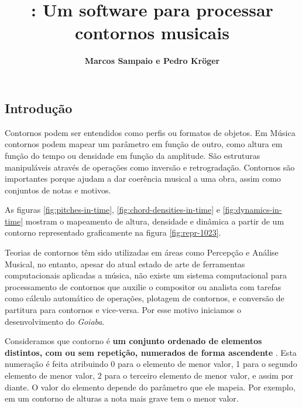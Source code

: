 \documentclass{sciposter}
\title{\goiaba{}: Um software para processar contornos musicais}
\author{\textbf{Marcos Sampaio e Pedro Kröger}}
\institute{Genos---Grupo de pesquisa em computação musical}
\newcommand{\goiaba}[1]{\textit{Goiaba}}
\begin{document}



\maketitle

\begin{multicols}{3}

\section{Introdução}

Contornos podem ser entendidos como perfis ou formatos de objetos. Em
Música contornos podem mapear um parâmetro em função de outro, como
altura em função do tempo ou densidade em função da amplitude. São
estruturas manipuláveis através de operações como inversão e
retrogradação. Contornos são importantes porque ajudam a dar coerência
musical a uma obra, assim como conjuntos de notas e motivos.

As figuras \ref{fig:pitches-in-time},
\ref{fig:chord-densities-in-time} e \ref{fig:dynamics-in-time} mostram
o mapeamento de altura, densidade e dinâmica a partir de um contorno
representado graficamente na figura \ref{fig:repr-1023}.

Teorias de contornos
\cite{friedmann85:methodology,morris87:composition,morris93:directions,marvin.ea87:relating,clifford95:contour,polansky.ea92:possible,quinn97:fuzzy,beard03:contour}
têm sido utilizadas em áreas como Percepção e Análise Musical, no
entanto, apesar do atual estado de arte de ferramentas computacionais
aplicadas a música, não existe um sistema computacional para
processamento de contornos que auxilie o compositor ou analista com
tarefas como cálculo automático de operações, plotagem de contornos, e
conversão de partitura para contornos e vice-versa. Por esse motivo
iniciamos o desenvolvimento do \goiaba{}.

Consideramos que contorno é \textbf{um conjunto ordenado de elementos
  distintos, com ou sem repetição, numerados de forma ascendente}
\cite[p. 206]{morris93:directions}. Esta numeração é feita atribuindo
0 para o elemento de menor valor, 1 para o segundo elemento de menor
valor, 2 para o terceiro elemento de menor valor, e assim por
diante. O valor do elemento depende do parâmetro que ele mapeia. Por
exemplo, em um contorno de alturas a nota mais grave tem o menor
valor.


\end{multicols}
\end{document}
